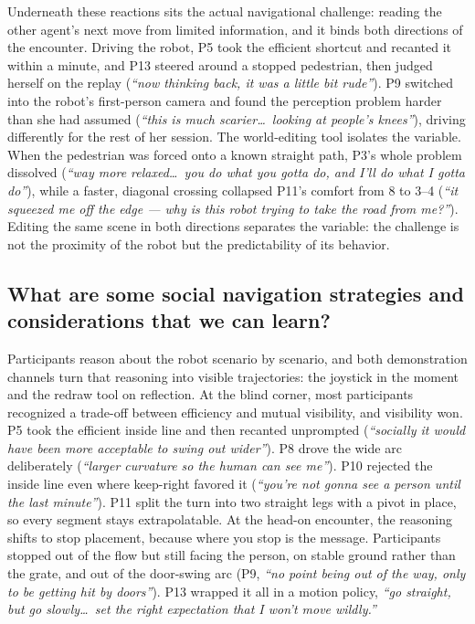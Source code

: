 Underneath these reactions sits the actual navigational challenge: reading the other agent's next move from limited information, and it binds both directions of the encounter. Driving the robot, P5 took the efficient shortcut and recanted it within a minute, and P13 steered around a stopped pedestrian, then judged herself on the replay (\emph{``now thinking back, it was a little bit rude''}). P9 switched into the robot's first-person camera and found the perception problem harder than she had assumed (\emph{``this is much scarier\dots\ looking at people's knees''}), driving differently for the rest of her session. The world-editing tool isolates the variable. When the pedestrian was forced onto a known straight path, P3's whole problem dissolved (\emph{``way more relaxed\dots\ you do what you gotta do, and I'll do what I gotta do''}), while a faster, diagonal crossing collapsed P11's comfort from 8 to 3--4 (\emph{``it squeezed me off the edge --- why is this robot trying to take the road from me?''}). Editing the same scene in both directions separates the variable: the challenge is not the proximity of the robot but the predictability of its behavior.

\subsection{What are some social navigation strategies and considerations that we can learn?}
Participants reason about the robot scenario by scenario, and both demonstration channels turn that reasoning into visible trajectories: the joystick in the moment and the redraw tool on reflection. At the blind corner, most participants recognized a trade-off between efficiency and mutual visibility, and visibility won. P5 took the efficient inside line and then recanted unprompted (\emph{``socially it would have been more acceptable to swing out wider''}). P8 drove the wide arc deliberately (\emph{``larger curvature so the human can see me''}). P10 rejected the inside line even where keep-right favored it (\emph{``you're not gonna see a person until the last minute''}). P11 split the turn into two straight legs with a pivot in place, so every segment stays extrapolatable. At the head-on encounter, the reasoning shifts to stop placement, because where you stop is the message. Participants stopped out of the flow but still facing the person, on stable ground rather than the grate, and out of the door-swing arc (P9, \emph{``no point being out of the way, only to be getting hit by doors''}). P13 wrapped it all in a motion policy, \emph{``go straight, but go slowly\dots\ set the right expectation that I won't move wildly.''}

